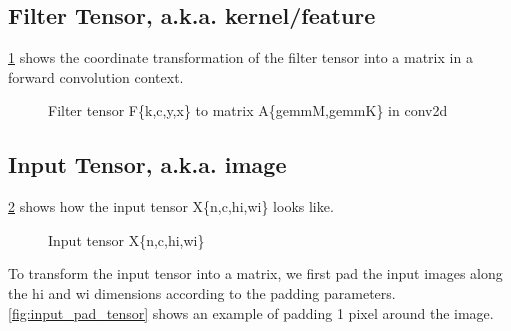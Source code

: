\subsection{Filter Tensor, a.k.a. kernel/feature}
\Fig \ref{fig:filter_tensor_to_matrix_A} shows the coordinate transformation of the filter tensor
into a matrix in a forward convolution context.

{}
\begin{figure}[!h]
  \centering
  \caption{Filter tensor F\{k,c,y,x\} to matrix A\{gemmM,gemmK\} in conv2d}
  \label{fig:filter_tensor_to_matrix_A}
\end{figure}


\subsection{Input Tensor, a.k.a. image}

\Fig \ref{fig:input_tensor} shows how the input tensor X\{n,c,hi,wi\} looks like.

{}
\begin{figure}[!h]
  \centering
  \caption{Input tensor X\{n,c,hi,wi\}}
  \label{fig:input_tensor}
\end{figure}

To transform the input tensor into a matrix, we first pad the input images along the hi and wi
dimensions according to the padding parameters.
\Fig \ref{fig:input_pad_tensor} shows an example of padding 1 pixel around the image.

